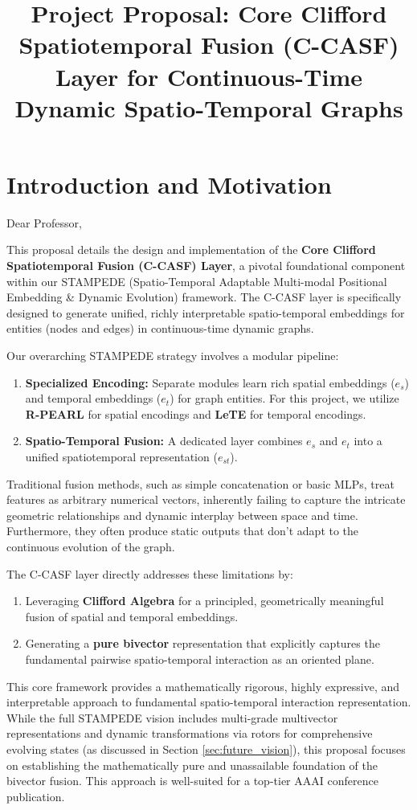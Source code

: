 \documentclass[11pt]{article}
\title{Project Proposal: Core Clifford Spatiotemporal Fusion (C-CASF) Layer for Continuous-Time Dynamic Spatio-Temporal Graphs}
\begin{document}
\maketitle

\section{Introduction and Motivation}

Dear Professor,

This proposal details the design and implementation of the \textbf{Core Clifford Spatiotemporal Fusion (C-CASF) Layer}, a pivotal foundational component within our STAMPEDE (Spatio-Temporal Adaptable Multi-modal Positional Embedding \& Dynamic Evolution) framework. The C-CASF layer is specifically designed to generate unified, richly interpretable spatio-temporal embeddings for entities (nodes and edges) in continuous-time dynamic graphs.

Our overarching STAMPEDE strategy involves a modular pipeline:
\begin{enumerate}
    \item \textbf{Specialized Encoding:} Separate modules learn rich spatial embeddings ($e_s$) and temporal embeddings ($e_t$) for graph entities. For this project, we utilize \textbf{R-PEARL} for spatial encodings and \textbf{LeTE} for temporal encodings.
    \item \textbf{Spatio-Temporal Fusion:} A dedicated layer combines $e_s$ and $e_t$ into a unified spatiotemporal representation ($e_{st}$).
\end{enumerate}
Traditional fusion methods, such as simple concatenation or basic MLPs, treat features as arbitrary numerical vectors, inherently failing to capture the intricate geometric relationships and dynamic interplay between space and time. Furthermore, they often produce static outputs that don't adapt to the continuous evolution of the graph.

The C-CASF layer directly addresses these limitations by:
\begin{enumerate}
    \item Leveraging \textbf{Clifford Algebra} for a principled, geometrically meaningful fusion of spatial and temporal embeddings.
    \item Generating a \textbf{pure bivector} representation that explicitly captures the fundamental pairwise spatio-temporal interaction as an oriented plane.
\end{enumerate}
This core framework provides a mathematically rigorous, highly expressive, and interpretable approach to fundamental spatio-temporal interaction representation. While the full STAMPEDE vision includes multi-grade multivector representations and dynamic transformations via rotors for comprehensive evolving states (as discussed in Section \ref{sec:future_vision}), this proposal focuses on establishing the mathematically pure and unassailable foundation of the bivector fusion. This approach is well-suited for a top-tier AAAI conference publication.
\end{document}
